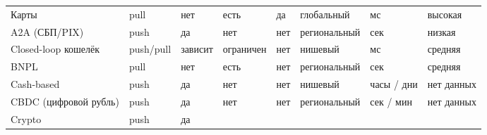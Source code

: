 \begin{table}[H]
  \begingroup
  \scriptsize
  \setlength{\tabcolsep}{2pt}
  \renewcommand{\arraystretch}{1.2}
  \begin{minipage}{\textwidth}
    \begin{tabularx}{\textwidth}{
        @{}B{0.170\textwidth}
        P{0.075\textwidth}
        P{0.095\textwidth}
        P{0.090\textwidth}
        P{0.085\textwidth}
        P{0.145\textwidth}
        P{0.100\textwidth}
        P{0.155\textwidth}@{}
      }
      \toprule
      \headrow
       &  &  &  &  &  &  &  \\
      \midrule
      Карты &
      pull &
      нет &
      есть &
      да &
      глобальный &
      мс &
      высокая \\
      A2A (СБП/PIX) &
      push &
      да &
      нет &
      нет &
      региональный &
      сек &
      низкая \\
      Closed-loop кошелёк &
      push/pull &
      зависит &
      ограничен &
      нет &
      нишевый &
      мс &
      средняя \\
      BNPL &
      pull &
      нет &
      есть &
      нет &
      региональный &
      сек &
      средняя \\
      Cash-based &
      push &
      да &
      нет &
      нет &
      нишевый &
      часы / дни &
      нет данных \\
      CBDC (цифровой рубль) &
      push &
      да &
      нет &
      нет &
      региональный &
      сек / мин &
      нет данных \\
      Crypto &
      push &
      да &

\end{tabularx}
\end{minipage}
\end{table}
